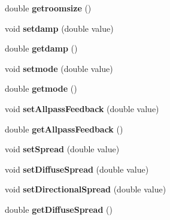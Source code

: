\begin{DoxyCompactItemize}
\item 
\hypertarget{class_freeverb_a4bc7df1e748137cc43cbdf24b2bfbad1}{double {\bfseries getroomsize} ()}\label{class_freeverb_a4bc7df1e748137cc43cbdf24b2bfbad1}

\item 
\hypertarget{class_freeverb_a9145740308baa361b65aec2b194d0946}{void {\bfseries setdamp} (double value)}\label{class_freeverb_a9145740308baa361b65aec2b194d0946}

\item 
\hypertarget{class_freeverb_a387e1a190b52eae5b826af43ed736921}{double {\bfseries getdamp} ()}\label{class_freeverb_a387e1a190b52eae5b826af43ed736921}

\item 
\hypertarget{class_freeverb_a12cdf4f59a4ef2ca1ba3b2ce1c79bf5c}{void {\bfseries setmode} (double value)}\label{class_freeverb_a12cdf4f59a4ef2ca1ba3b2ce1c79bf5c}

\item 
\hypertarget{class_freeverb_a65b4185a2c9fc29073346186f13cfb9e}{double {\bfseries getmode} ()}\label{class_freeverb_a65b4185a2c9fc29073346186f13cfb9e}

\item 
\hypertarget{class_freeverb_aae97fb7195924eb79d51b21ad156fdf8}{void {\bfseries set\-Allpass\-Feedback} (double value)}\label{class_freeverb_aae97fb7195924eb79d51b21ad156fdf8}

\item 
\hypertarget{class_freeverb_a846640ad90542d86246b6827c5b1bfee}{double {\bfseries get\-Allpass\-Feedback} ()}\label{class_freeverb_a846640ad90542d86246b6827c5b1bfee}

\item 
\hypertarget{class_freeverb_ae22eb2fac0fb0caa38a2337918ab3192}{void {\bfseries set\-Spread} (double value)}\label{class_freeverb_ae22eb2fac0fb0caa38a2337918ab3192}

\item 
\hypertarget{class_freeverb_a96b732e8b5f4cb318960f4e1c9c7cf61}{void {\bfseries set\-Diffuse\-Spread} (double value)}\label{class_freeverb_a96b732e8b5f4cb318960f4e1c9c7cf61}

\item 
\hypertarget{class_freeverb_ae40290ed1c46c4e0410a0da007629546}{void {\bfseries set\-Directional\-Spread} (double value)}\label{class_freeverb_ae40290ed1c46c4e0410a0da007629546}

\item 
\hypertarget{class_freeverb_a33c754bdd65872535c8a44f499797afb}{double {\bfseries get\-Diffuse\-Spread} ()}\label{class_freeverb_a33c754bdd65872535c8a44f499797afb}


\end{DoxyCompactItemize}
